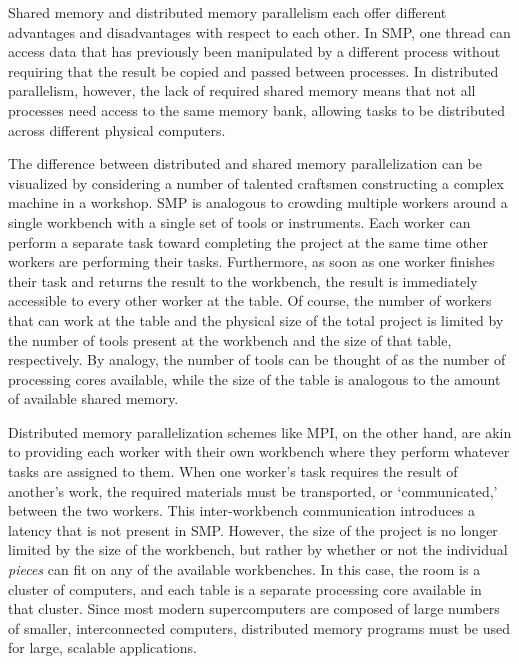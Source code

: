 Shared memory and distributed memory parallelism each offer different advantages
and disadvantages with respect to each other. In SMP, one thread can access data
that has previously been manipulated by a different process without requiring
that the result be copied and passed between processes. In distributed
parallelism, however, the lack of required shared memory means that not all
processes need access to the same memory bank, allowing tasks to be distributed
across different physical computers.

The difference between distributed and shared memory parallelization can be
visualized by considering a number of talented craftsmen constructing a complex
machine in a workshop. SMP is analogous to crowding multiple workers around a
single workbench with a single set of tools or instruments. Each worker can
perform a separate task toward completing the project at the same time other
workers are performing their tasks. Furthermore, as soon as one worker finishes
their task and returns the result to the workbench, the result is immediately
accessible to every other worker at the table. Of course, the number of workers
that can work at the table and the physical size of the total project is limited
by the number of tools present at the workbench and the size of that table,
respectively. By analogy, the number of tools can be thought of as the number of
processing cores available, while the size of the table is analogous to the
amount of available shared memory.

Distributed memory parallelization schemes like MPI, on the other hand, are akin
to providing each worker with their own workbench where they perform whatever
tasks are assigned to them. When one worker's task requires the result of
another's work, the required materials must be transported, or `communicated,'
between the two workers. This inter-workbench communication introduces a latency
that is not present in SMP. However, the size of the project is no longer
limited by the size of the workbench, but rather by whether or not the
individual \emph{pieces} can fit on any of the available workbenches. In this
case, the room is a cluster of computers, and each table is a separate
processing core available in that cluster. Since most modern supercomputers are
composed of large numbers of smaller, interconnected computers, distributed
memory programs must be used for large, scalable applications.

